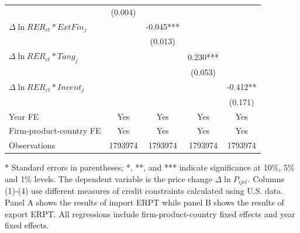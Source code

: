 \documentclass[12pt]{article}
\begin{document}
\begin{table}[htbp]
\begin{threeparttable}
\begin{tabular}{lcccc}
		& (0.004) &       &       &  \\
		$\Delta \ln RER_{ct}*ExtFin_{j}$ &       & -0.045*** &       &  \\
		&       & (0.013) &       &  \\
		$\Delta \ln RER_{ct}*Tang_{j}$ &       &       & 0.230*** &  \\
		&       &       & (0.053) &  \\
		$\Delta \ln RER_{ct}*Invent_{j}$ &       &       &       & -0.412** \\
		&       &       &       & (0.171) \\
		Year FE  & Yes   & Yes   & Yes   & Yes \\
		Firm-product-country FE & Yes   & Yes   & Yes   & Yes \\
		Observations & 1793974 & 1793974 & 1793974 & 1793974 \\
		\bottomrule
	\end{tabular}
	\begin{tablenotes}
		\footnotesize
		\item[*] Standard errors in parentheses; *, **, and *** indicate significance at 10\%, 5\% and 1\% levels. The dependent variable is the price change $\Delta \ln P_{ijct}$. Columns (1)-(4) use different measures of credit constraints calculated using U.S. data. Panel A shows the results of import ERPT while panel B shows the results of export ERPT. All regressions include firm-product-country fixed effects and year fixed effects.
	\end{tablenotes}
	\end{threeparttable}
        \label{tab.credit}
\end{table}
\end{document}

